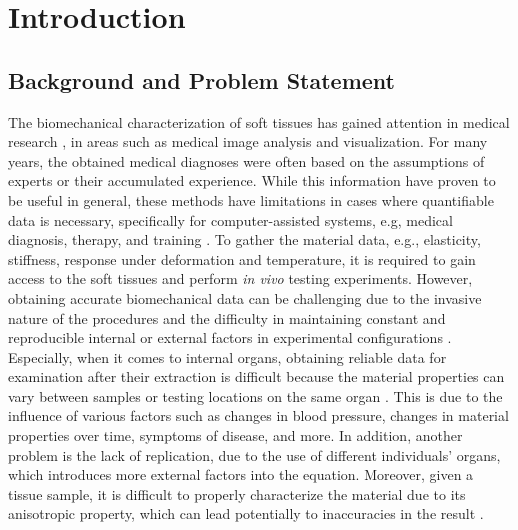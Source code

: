 
\chapter{Introduction} %
\label{chapter:introduction} %

\section{Background and Problem Statement}
The biomechanical characterization of soft tissues has gained attention
in medical research \cite{Cox2006}, in areas such as medical image analysis and visualization.
For many years, the obtained medical diagnoses were often based on the assumptions of experts or 
their accumulated experience. While this information have proven to be useful in general, 
these methods have limitations in cases where quantifiable data is necessary, specifically for computer-assisted systems, e.g,
medical diagnosis, therapy, and training \cite{Kauer2002}.
To gather the material data, e.g., elasticity, stiffness, response under deformation and temperature, it is required 
to gain access to the soft tissues and perform \textit{in vivo} testing experiments. 
However, obtaining accurate biomechanical data can be challenging 
due to the invasive nature of the procedures and the difficulty in maintaining constant and reproducible internal or external factors  
in experimental configurations \cite{Carter2001}.\\

Especially, when it comes to internal organs, obtaining reliable data for examination after their 
extraction is difficult because the material properties can vary between samples or testing 
locations on the same organ \cite{Chai2013}. This is due to the influence of various factors such as changes in blood pressure, changes in material properties 
over time, symptoms of disease, and more. In addition, another problem is the lack 
of replication, due to the use of different individuals' organs, which introduces more external
factors into the equation. Moreover, given a tissue sample, it is difficult to properly 
characterize the material due to its anisotropic property, which can lead potentially
 to inaccuracies in the result \cite{Cox2006}.

